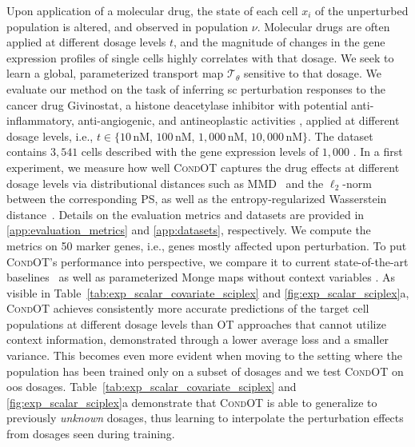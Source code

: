 Upon application of a molecular drug, the state of each cell $x_i$ of the unperturbed population is altered, and observed in population $\nu$.
Molecular drugs are often applied at different dosage levels $t$, and the magnitude of changes in the gene expression profiles of single cells highly correlates with that dosage. 
We seek to learn a global, parameterized transport map $\mathcal{T}_\theta$ sensitive to that dosage.%
We evaluate our method on the task of inferring \acrlong{sc} perturbation responses to the cancer drug Givinostat, a histone deacetylase inhibitor with potential anti-inflammatory, anti-angiogenic, and antineoplastic activities \citep{srivatsan2020massively}, applied at different dosage levels, i.e., $t \in \{10\,$nM, $100\,$nM, $1,000\,$nM, $10,000\,$nM$\}$. The dataset contains $3,541$ cells described with the gene expression levels of $1,000$ .
In a first experiment, we measure how well \textsc{CondOT} captures the drug effects at different dosage levels via distributional distances such as \acrshort{MMD}~\citep{gretton2012kernel} and the $\ell_2$-norm between the corresponding \acrfull{PS}, as well as the entropy-regularized Wasserstein distance~\citep{cuturi2013sinkhorn}. Details on the evaluation metrics and datasets are provided in \cref{app:evaluation_metrics} and \cref{app:datasets}, respectively. 
We compute the metrics on 50 marker genes, i.e., genes mostly affected upon perturbation.
To put \textsc{CondOT}'s performance into perspective, we compare it to current state-of-the-art baselines~\citep{lotfollahi2021compositional} as well as parameterized Monge maps without context variables \citep[\textsc{ICNN OT}]{bunne2021learning, makkuva2020optimal}.
As visible in Table~\ref{tab:exp_scalar_covariate_sciplex} and \cref{fig:exp_scalar_sciplex}a, \textsc{CondOT} achieves consistently more accurate predictions of the target cell populations at different dosage levels than \acrshort{OT} approaches that cannot utilize context information, demonstrated through a lower average loss and a smaller variance.
This becomes even more evident when moving to the setting where the population has been trained only on a subset of dosages and we test \textsc{CondOT} on \acrlong{oos} dosages. Table~\ref{tab:exp_scalar_covariate_sciplex} and \cref{fig:exp_scalar_sciplex}a demonstrate that \textsc{CondOT} is able to generalize to previously \emph{unknown} dosages, thus learning to interpolate the perturbation effects from dosages seen during training.
